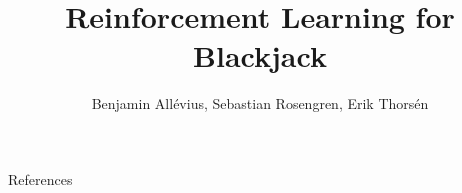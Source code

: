 \documentclass{beamer}
\title[Reinforcement Learning]{ Reinforcement Learning for Blackjack} %
\author{Benjamin Allévius, Sebastian Rosengren, Erik Thorsén} %
\institute[SU] %
{
Department of Mathematics, Stockholm University
}
\date %
\begin{document}
	
\begin{frame}
	\titlepage %
	\centering
\end{frame}




\begin{frame}{References}


\end{frame}
\end{document}
